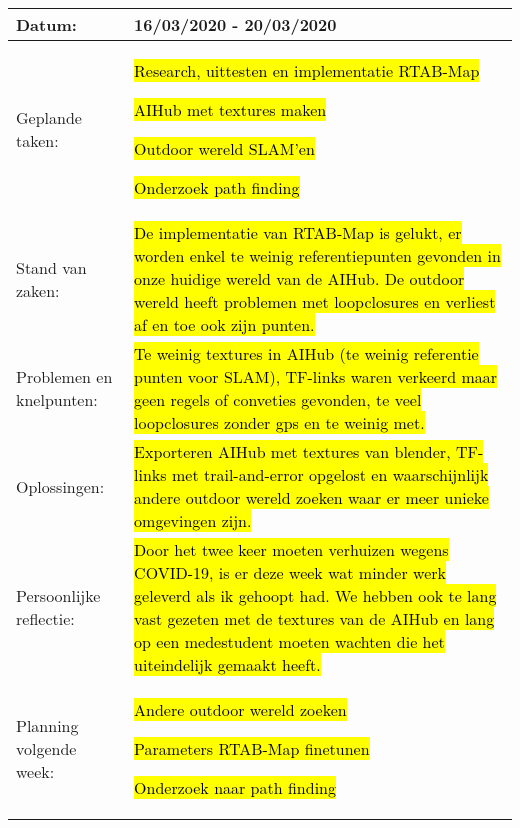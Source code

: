 \begin{tabularx}{\textwidth}{| l | X |}
  \hline
  Datum: & 16/03/2020 - 20/03/2020\\
  \hline
  Geplande taken: &
  \begin{compactitem}
    \item \hl{Research, uittesten en implementatie RTAB-Map}
    \item \hl{AIHub met textures maken}
    \item \hl{Outdoor wereld SLAM'en}
    \item \hl{Onderzoek path finding}
  \end{compactitem}\\
  \hline
  Stand van zaken: & \hl{De implementatie van RTAB-Map is gelukt, er worden enkel te weinig referentiepunten gevonden in onze huidige wereld van de AIHub. De outdoor wereld heeft problemen met loopclosures en verliest af en toe ook zijn punten.}\\
  \hline
  Problemen en knelpunten: & \hl{Te weinig textures in AIHub (te weinig referentie punten voor SLAM), TF-links waren verkeerd maar geen regels of conveties gevonden, te veel loopclosures zonder gps en te weinig met.}\\
  \hline
  Oplossingen: & \hl{Exporteren AIHub met textures van blender, TF-links met trail-and-error opgelost en waarschijnlijk andere outdoor wereld zoeken waar er meer unieke omgevingen zijn.}\\
  \hline
  Persoonlijke reflectie: & \hl{Door het twee keer moeten verhuizen wegens COVID-19, is er deze week wat minder werk geleverd als ik gehoopt had. We hebben ook te lang vast gezeten met de textures van de AIHub en lang op een medestudent moeten wachten die het uiteindelijk gemaakt heeft.}\\
  \hline
  Planning volgende week: & 
  \begin{compactitem}
    \item \hl{Andere outdoor wereld zoeken}
    \item \hl{Parameters RTAB-Map finetunen}
    \item \hl{Onderzoek naar path finding}
  \end{compactitem}\\
  \hline
\end{tabularx}